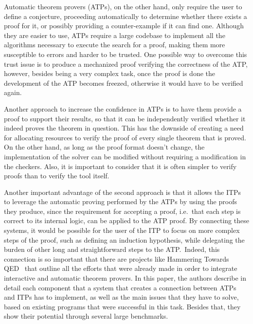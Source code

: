 Automatic theorem provers (ATPs), on the other hand,
only require the user to define a conjecture, proceeding automatically to
determine whether there exists a proof for it, or possibly providing a
counter-example if it can find one.
%
Although they are easier to use, ATPs require a large
codebase to implement all the algorithms necessary to execute the search for a proof,
making them more susceptible to errors and harder to be trusted.
One possible way to overcome this trust issue is to produce
a mechanized proof verifying the correctness of the ATP, however,
besides being a very complex task, once the proof is done the
development of the ATP becomes freezed, otherwise it would
have to be verified again.

Another approach to increase the confidence in ATPs is to have them provide a
proof to support their results, so that it can be independently verified whether
it indeed proves the theorem in question. This has the downside of creating a need
for allocating resources to verify the proof of every single theorem that is proved.
On the other hand, as long as the proof format doesn't change, the implementation
of the solver can be modified without requiring a modification in the checkers. Also,
it is important to consider that it is often simpler to verify proofs than to verify
the tool itself.

Another important advantage of the second approach is that it allows the ITPs to leverage the automatic proving performed by the ATPs by using the proofs they produce, since the requirement for accepting a proof, i.e.\ that each step is correct to its internal logic,
can be applied to the ATP proof.
%
By connecting these systems, it would be possible for the user of the ITP to focus on more complex steps of the proof, such as defining an induction hypothesis, while delegating the burden of other long and straightforward steps to the ATP.\ Indeed, this
connection is so important that there are projects like Hammering Towards QED~\cite{hammering}
that outline all the efforts that were already made in order to integrate
interactive and automatic theorem provers. In this paper, the authors describe in detail each component that a system that creates a connection between ATPs and ITPs has to implement, as well as the main issues that they have to solve, based on existing programs that were successful in this task. Besides that, they show their potential through several large benchmarks. 

